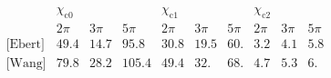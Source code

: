 $$
\begin{array}{c|ccc|ccc|ccc}
 \text{} & \chi _{\text{c0}} &  &  & \chi _{\text{c1}} &  &  & \chi _{\text{c2}} &  &  \\
 \text{} & \text{2$\pi $} & \text{3$\pi $} & \text{5$\pi $} & \text{2$\pi $} & \text{3$\pi $} & \text{5$\pi $} & \text{2$\pi $} & \text{3$\pi $} & \text{5$\pi $} \\
\hline
 \text{[Ebert]} & 49.4 & 14.7 & 95.8 & 30.8 & 19.5 & 60. & 3.2 & 4.1 & 5.8 \\
 \text{[Wang]} & 79.8 & 28.2 & 105.4 & 49.4 & 32. & 68. & 4.7 & 5.3 & 6. \\
\end{array}$$
